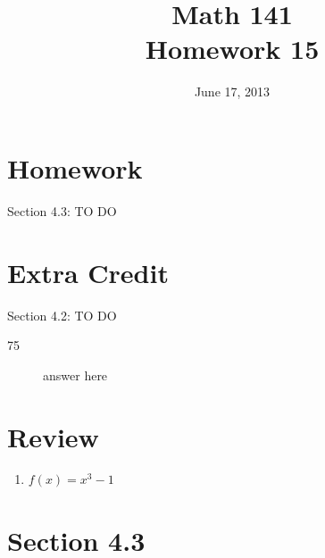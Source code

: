 \documentclass{exam}
\date{June 17, 2013}
\author{}
\title{Math 141 \\ Homework 15}
\begin{document}
  \maketitle

  \section{Homework}

  Section 4.3: TO DO

 \section{Extra Credit}
  Section 4.2: TO DO

  \ifprintanswers
    \begin{description}
      \item[75]
        answer here
    \end{description}
  \fi

  \section{Review}

  \begin{enumerate}

    \item $f(x) = x^3 - 1$ 

  \end{enumerate}

  \ifprintanswers
    \section{Section 4.3}
\end{document}
